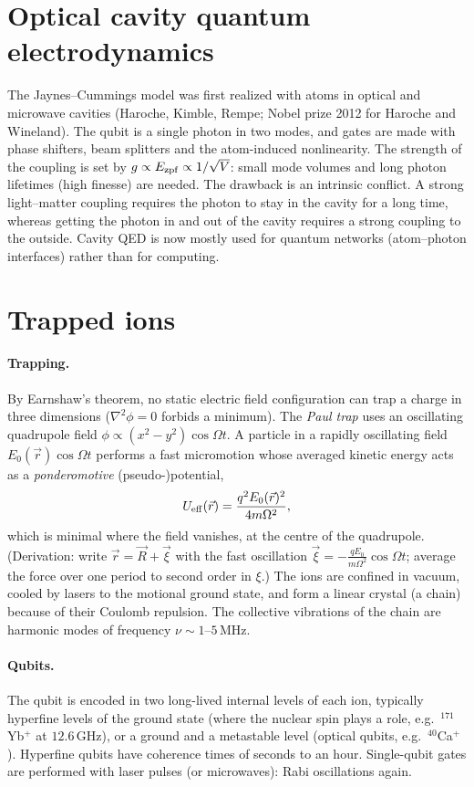 \section{Optical cavity quantum electrodynamics}
The Jaynes--Cummings model was first realized with atoms in optical and microwave cavities (Haroche, Kimble, Rempe; Nobel prize 2012 for Haroche and Wineland). The qubit is a single photon in two modes, and gates are made with phase shifters,
beam splitters and the atom-induced nonlinearity. The strength of the coupling is set by $g\propto E_{\rm zpf}\propto1/\sqrt V$: small mode volumes and long photon lifetimes (high finesse) are needed. The drawback is an intrinsic conflict.
A strong light--matter coupling requires the photon to stay in the cavity for a long time, whereas getting the photon in and out of the cavity requires a strong coupling to the outside. Cavity QED is now mostly used for quantum networks
(atom--photon interfaces) rather than for computing.

\section{Trapped ions}\label{sec:ions}
\paragraph{Trapping.} By Earnshaw's theorem, no static electric field configuration can trap a charge in three dimensions ($\nabla^2\phi=0$ forbids a minimum). The \emph{Paul trap} uses an oscillating quadrupole field
$\phi\propto(x^2-y^2)\cos\Omega t$. A particle in a rapidly oscillating field $E_0(\vec r)\cos\Omega t$ performs a fast micromotion whose averaged kinetic energy acts as a \emph{ponderomotive} (pseudo-)potential,
\begin{equation}
  U_{\rm eff}(\vec r)=\frac{q^2E_0(\vec r)^2}{4m\Omega^2},
\end{equation}
which is minimal where the field vanishes, at the centre of the quadrupole. (Derivation: write $\vec r=\vec R+\vec\xi$ with the fast oscillation $\vec\xi=-\frac{qE_0}{m\Omega^2}\cos\Omega t$; average the force over one period to second order in $\xi$.)
The ions are confined in vacuum, cooled by lasers to the motional ground state, and form a linear crystal (a chain) because of their Coulomb repulsion. The collective vibrations of the chain are harmonic modes of frequency $\nu\sim1$--$5$\,MHz.

\paragraph{Qubits.} The qubit is encoded in two long-lived internal levels of each ion, typically hyperfine levels of the ground state (where the nuclear spin plays a role, e.g.\ $^{171}$Yb$^+$ at $12.6$\,GHz), or a ground and a metastable level
(optical qubits, e.g.\ $^{40}$Ca$^+$). Hyperfine qubits have coherence times of seconds to an hour. Single-qubit gates are performed with laser pulses (or microwaves): Rabi oscillations again.

